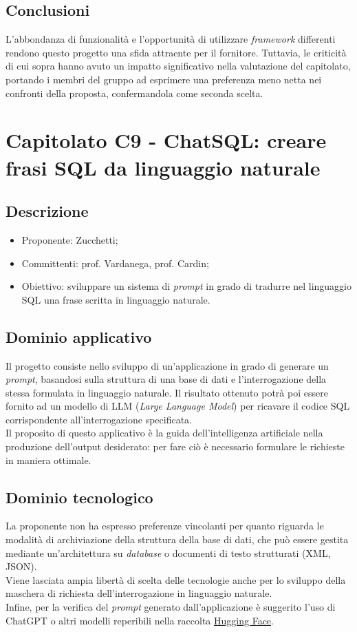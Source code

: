 \documentclass[8pt]{article}
\begin{document}
\subsection{Conclusioni}
L'abbondanza di funzionalità e l'opportunità di utilizzare \textit{framework} differenti rendono questo progetto una sfida attraente per il fornitore. Tuttavia, le criticità di cui sopra hanno avuto un impatto significativo nella valutazione del capitolato, portando i membri del gruppo ad esprimere una preferenza meno netta nei confronti della proposta, confermandola come seconda scelta.

\newpage

\section{Capitolato C9 - ChatSQL: creare frasi SQL da linguaggio naturale} \label{sec:C9}
\subsection{Descrizione}
\begin{itemize}
	\setlength\itemsep{0em}
	\item Proponente: Zucchetti;
	\item Committenti: prof. Vardanega, prof. Cardin;
	\item Obiettivo: sviluppare un sistema di \textit{prompt} in grado di tradurre nel linguaggio SQL una frase scritta in linguaggio naturale.
\end{itemize}

\subsection{Dominio applicativo}
Il progetto consiste nello sviluppo di un'applicazione in grado di generare un \textit{prompt}, basandosi sulla struttura di una base di dati e l'interrogazione della stessa formulata in linguaggio naturale. Il risultato ottenuto potrà poi essere fornito ad un modello di LLM (\textit{Large Language Model}) per ricavare il codice SQL corrispondente all'interrogazione specificata. \\ Il proposito di questo applicativo è la guida dell'intelligenza artificiale nella produzione dell'output desiderato: per fare ciò è necessario formulare le richieste in maniera ottimale. 

\subsection{Dominio tecnologico}
La proponente non ha espresso preferenze vincolanti per quanto riguarda le modalità di archiviazione della struttura della base di dati, che può essere gestita mediante un'architettura su \textit{database} o documenti di testo strutturati (XML, JSON). \\ Viene lasciata ampia libertà di scelta delle tecnologie anche per lo sviluppo della maschera di richiesta dell'interrogazione in linguaggio naturale. \\ Infine, per la verifica del \textit{prompt} generato dall'applicazione è suggerito l'uso di ChatGPT o altri modelli reperibili nella raccolta \href{https://huggingface.co}{Hugging Face}.
\end{document}
